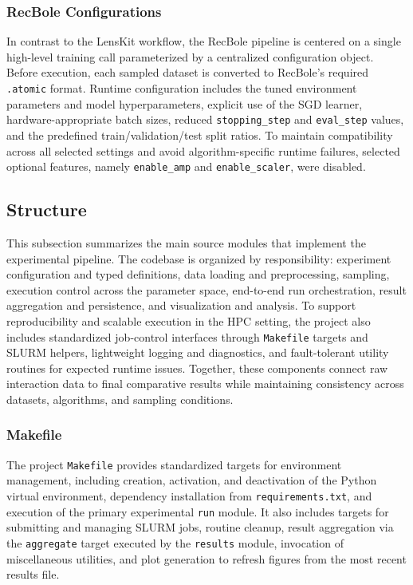 \documentclass[12pt,a4paper]{article}
\begin{document}
\subsubsection{RecBole Configurations}
In contrast to the LensKit workflow, the RecBole pipeline is centered on a single high-level training call parameterized by a centralized configuration object. Before execution, each sampled dataset is converted to RecBole's required \texttt{.atomic} format. Runtime configuration includes the tuned environment parameters and model hyperparameters, explicit use of the SGD learner, hardware-appropriate batch sizes, reduced \texttt{stopping\_step} and \texttt{eval\_step} values, and the predefined train/validation/test split ratios. To maintain compatibility across all selected settings and avoid algorithm-specific runtime failures, selected optional features, namely \texttt{enable\_amp} and \texttt{enable\_scaler}, were disabled.

\subsection{Structure}
This subsection summarizes the main source modules that implement the experimental pipeline. The codebase is organized by responsibility: experiment configuration and typed definitions, data loading and preprocessing, sampling, execution control across the parameter space, end-to-end run orchestration, result aggregation and persistence, and visualization and analysis. To support reproducibility and scalable execution in the HPC setting, the project also includes standardized job-control interfaces through \texttt{Makefile} targets and SLURM helpers, lightweight logging and diagnostics, and fault-tolerant utility routines for expected runtime issues. Together, these components connect raw interaction data to final comparative results while maintaining consistency across datasets, algorithms, and sampling conditions.

\subsubsection{Makefile}
The project \texttt{Makefile} \cite{make} provides standardized targets for environment management, including creation, activation, and deactivation of the Python virtual environment, dependency installation from \texttt{requirements.txt}, and execution of the primary experimental \texttt{run} module. It also includes targets for submitting and managing SLURM jobs, routine cleanup, result aggregation via the \texttt{aggregate} target executed by the \texttt{results} module, invocation of miscellaneous utilities, and plot generation to refresh figures from the most recent results file.
\end{document}

